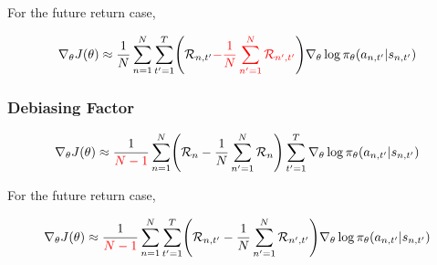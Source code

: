 \documentclass{article}
\begin{document}
For the future return case, 

\begin{eqnarray}
\nabla_\theta J(\theta) 
\approx \frac{1}{N} \sum_{n=1}^{N} \sum_{t^\prime=1}^{T} \Biggl(\mathcal{R}_{n, t^\prime} {\color{red}{- \frac{1}{N} \sum_{n^\prime=1}^N \mathcal{R}_{n^\prime, t^\prime} }} \Biggr)  \nabla_\theta \log \pi_\theta (a_{n, t^\prime}|s_{n, t^\prime}) 
\end{eqnarray}

\subsubsection{Debiasing Factor}

\begin{eqnarray}
\nabla_\theta J(\theta) 
\approx \frac{1}{{\color{red}{N-1}}} \sum_{n=1}^{N} \Biggl(\mathcal{R}_n - \frac{1}{N} \sum_{n^\prime=1}^N \mathcal{R}_n \Biggr)\sum_{t^\prime=1}^{T} \nabla_\theta \log \pi_\theta (a_{n, t^\prime}|s_{n, t^\prime}) 
\end{eqnarray}

For the future return case, 

\begin{eqnarray}
\nabla_\theta J(\theta) 
\approx \frac{1}{{\color{red}{N-1}}} \sum_{n=1}^{N} \sum_{t^\prime=1}^{T} \Biggl(\mathcal{R}_{n, t^\prime} - \frac{1}{N} \sum_{n^\prime=1}^N \mathcal{R}_{n^\prime, t^\prime} \Biggr)  \nabla_\theta \log \pi_\theta (a_{n, t^\prime}|s_{n, t^\prime}) 
\end{eqnarray}




\end{document}
